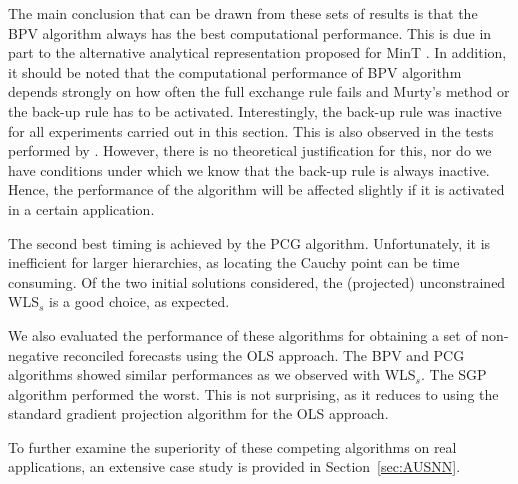 \documentclass[11pt]{article}
\newcommand{\0}{\phantom{0}}
\begin{document}
The main conclusion that can be drawn from these sets of results is that the BPV algorithm always has the best computational performance. This is due in part to the alternative analytical representation proposed for MinT \citep{Wick2018}. In addition, it should be noted that the computational performance of BPV algorithm depends strongly on how often the full exchange rule fails and Murty's method or the back-up rule has to be activated. Interestingly, the back-up rule was inactive for all experiments carried out in this section. This is also observed in the tests performed by \citet{Kim2011}. However, there is no theoretical justification for this, nor do we have conditions under which we know that the back-up rule is always inactive. Hence, the performance of the algorithm will be affected slightly if it is activated in a certain application.

The second best timing is achieved by the PCG algorithm. Unfortunately, it is inefficient for larger hierarchies, as locating the Cauchy point can be time consuming. Of the two initial solutions considered, the (projected) unconstrained WLS$_s$ is a good choice, as expected. 

We also evaluated the performance of these algorithms for obtaining a set of non-negative reconciled forecasts using the OLS approach. The BPV and PCG algorithms showed similar performances as we observed with WLS$_s$. The SGP algorithm performed the worst. This is not surprising, as it reduces to using the standard gradient projection algorithm for the OLS approach.

To further examine the superiority of these competing algorithms on real applications, an extensive case study is provided in Section~\ref{sec:AUSNN}.
\end{document}
